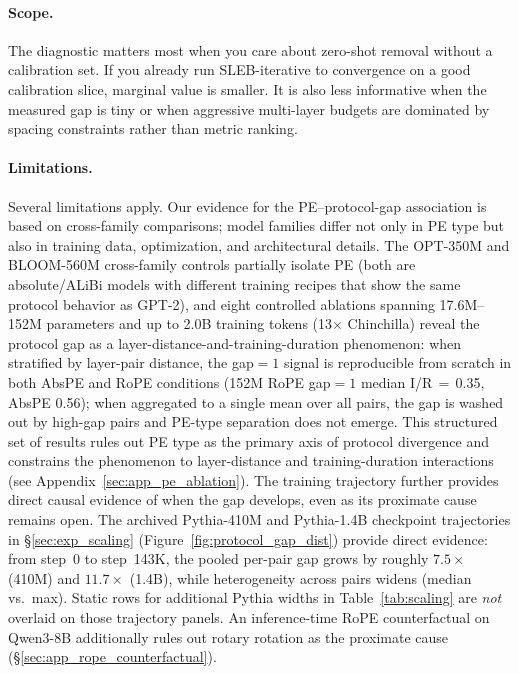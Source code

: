 \documentclass{article}
\begin{document}
\paragraph{Scope.}
The diagnostic matters most when you care about zero-shot removal without a calibration set. If you already run SLEB-iterative to convergence on a good calibration slice, marginal value is smaller. It is also less informative when the measured gap is tiny or when aggressive multi-layer budgets are dominated by spacing constraints rather than metric ranking.

\paragraph{Limitations.}
Several limitations apply. Our evidence for the PE--protocol-gap association is based on cross-family comparisons; model families differ not only in PE type but also in training data, optimization, and architectural details. The OPT-350M and BLOOM-560M cross-family controls partially isolate PE (both are absolute/ALiBi models with different training recipes that show the same protocol behavior as GPT-2), and eight controlled ablations spanning 17.6M--152M parameters and up to 2.0B training tokens (13$\times$ Chinchilla) reveal the protocol gap as a layer-distance-and-training-duration phenomenon: when stratified by layer-pair distance, the gap${=}1$ signal is reproducible from scratch in both AbsPE and RoPE conditions (152M RoPE gap${=}1$ median I/R\,$=$\,0.35, AbsPE 0.56); when aggregated to a single mean over all pairs, the gap is washed out by high-gap pairs and PE-type separation does not emerge. This structured set of results rules out PE type as the primary axis of protocol divergence and constrains the phenomenon to layer-distance and training-duration interactions (see Appendix~\ref{sec:app_pe_ablation}). The training trajectory further provides direct causal evidence of when the gap develops, even as its proximate cause remains open. The archived Pythia-410M and Pythia-1.4B checkpoint trajectories in \S\ref{sec:exp_scaling} (Figure~\ref{fig:protocol_gap_dist}) provide direct evidence: from step~0 to step~143K, the pooled per-pair gap grows by roughly $7.5\times$ (410M) and $11.7\times$ (1.4B), while heterogeneity across pairs widens (median vs.\ max). Static rows for additional Pythia widths in Table~\ref{tab:scaling} are \emph{not} overlaid on those trajectory panels. An inference-time RoPE counterfactual on Qwen3-8B additionally rules out rotary rotation as the proximate cause (\S\ref{sec:app_rope_counterfactual}).
\end{document}
